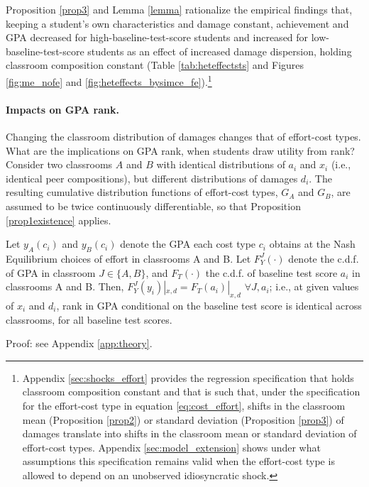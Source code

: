 Proposition \ref{prop3} and Lemma \ref{lemma} rationalize the empirical findings that, keeping a student's own characteristics and damage constant, achievement and GPA decreased for high-baseline-test-score students and increased for low-baseline-test-score students as an effect of increased damage dispersion, holding classroom composition constant (Table \ref{tab:heteffectsts} and Figures \ref{fig:me_nofe} and \ref{fig:heteffects_bysimce_fe}).\footnote{Appendix \ref{sec:shocks_effort} provides the regression specification that holds classroom composition constant and that is such that, under the specification for the effort-cost type in equation \eqref{eq:cost_effort}, shifts in the classroom mean (Proposition \ref{prop2}) or standard deviation (Proposition \ref{prop3}) of damages translate into shifts in the classroom mean or standard deviation of effort-cost types. Appendix \ref{sec:model_extension} shows under what assumptions this specification remains valid when the effort-cost type is allowed to depend on an unobserved idiosyncratic shock.}  \par 
 
\paragraph{Impacts on GPA rank.} Changing the classroom distribution of damages changes that of effort-cost types. What are the implications on GPA rank, when students draw utility from rank? Consider two classrooms $A$ and $B$ with identical distributions of $a_i$ and $x_i$ (i.e., identical peer compositions), but different distributions of damages $d_i$. The resulting cumulative distribution functions of effort-cost types, $G_A$ and $G_B$, are assumed to be twice continuously differentiable, so that Proposition \ref{prop1existence} applies.\par 

\begin{proposition}\label{prop4} Let $y_A(c_i)$ and $y_B(c_i)$ denote the GPA each cost type $c_i$ obtains at the Nash Equilibrium choices of effort in classrooms A and B. Let $F_Y^J(\cdot)$ denote the c.d.f. of GPA in classroom $J\in\{A,B\}$, and $F_{T}(\cdot)$ the c.d.f. of baseline test score $a_i$ in classrooms A and B. Then, $F_Y^J(y_i)|_{x,d}=F_T(a_i)|_{x,d}$ $\forall J, a_i$; i.e., at given values of $x_i$ and $d_i$, rank in GPA conditional on the baseline test score is identical across classrooms, for all baseline test scores.

\end{proposition}
 Proof: see Appendix \ref{app:theory}.\par 

